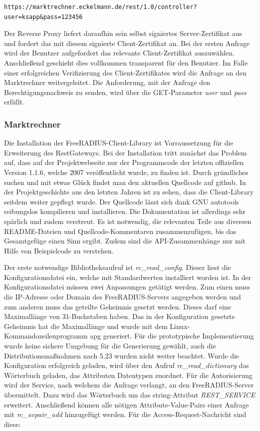 \documentclass[11pt,a4paper]{report}
\begin{document}
\begin{lstlisting}[caption=HTTPS-Anfrage an Reverse Proxy, label=lst:https_request]
https://marktrechner.eckelmann.de/rest/1.0/controller?user=ksapp&pass=123456
\end{lstlisting}

Der Reverse Proxy liefert daraufhin sein selbst signiertes Server-Zertifikat aus und fordert das mit diesem signierte Client-Zertifikat an. Bei der ersten Anfrage wird der Benutzer aufgefordert das relevante Client-Zertifikat auszuwählen. Anschließend geschieht dies vollkommen transparent für den Benutzer. Im Falle einer erfolgreichen Verifizierung des Client-Zertifikates wird die Anfrage an den Marktrechner weitergeleitet. Die Anforderung, mit der Anfrage den Berechtigungsnachweis zu senden, wird über die GET-Parameter \textit{user} und \textit{pass} erfüllt.

\subsubsection{Marktrechner}

Die Installation der FreeRADIUS-Client-Library ist Vorraussetzung für die Erweiterung des RestGateways. Bei der Installation tritt zunächst das Problem auf, dass auf der Projektwebseite nur der Programmcode der letzten offiziellen Version 1.1.6, welche 2007 veröffentlicht wurde, zu finden ist. Durch gründliches suchen und mit etwas Glück findet man den aktuellen Quellcode auf github. In der Projektgeschichte aus den letzten Jahren ist zu sehen, dass die Client-Library seitdem weiter gepflegt wurde. Der Quellcode lässt sich dank GNU autotools reibungslos kompilieren und installieren. Die Dokumentation ist allerdings sehr spärlich und zudem verstreut. Es ist notwendig, die relevanten Teile aus diversen README-Dateien und Quellcode-Kommentaren zusammenzufügen, bis das Gesamtgefüge einen Sinn ergibt. Zudem sind die API-Zusammenhänge nur mit Hilfe von Beispielcode zu 
verstehen.

Der erste notwendige Bibliotheksaufruf ist \textit{rc\_read\_config}. Dieser liest die Konfigurationsdatei ein, welche mit Standardwerten installiert worden ist. In der Konfigurationsdatei müssen zwei Anpassungen getätigt werden. Zum einen muss die IP-Adresse oder Domain des FreeRADIUS-Servers angegeben werden und zum anderen muss das geteilte Geheimnis gesetzt werden. Dieses darf eine Maximallänge von 31-Buchstaben haben. Das in der Konfiguration gesetzte Geheimnis hat die Maximallänge und wurde mit dem Linux-Kommandozeilenprogramm apg generiert. Für die prototypische Implementierung wurde keine sichere Umgebung für die Generierung gewählt, auch die Distributionsmaßnahmen nach 5.23 wurden nicht weiter beachtet. Wurde die Konfiguration erfolgreich geladen, wird über den Aufruf \textit{rc\_read\_dictionary} das Wörterbuch geladen, das Attributen Datentypen zuordnet. Für die Autorisierung wird der Service, nach welchem die Anfrage verlangt, an den FreeRADIUS-Server übermittelt. Dazu wird das Wörterbuch um das string-Attribut \textit{REST\_SERVICE} erweitert. Anschließend können alle nötigen Attribute-Value-Pairs einer Anfrage mit \textit{rc\_avpair\_add} hinzugefügt werden. Für die Access-Request-Nachricht sind diese:
\end{document}
